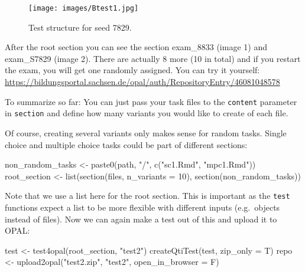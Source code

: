 \documentclass[twoside]{tufte-book}
\newenvironment{Shaded}{}{}
\newcommand{\AttributeTok}[1]{\textcolor[rgb]{0.49,0.56,0.16}{#1}}
\newcommand{\DecValTok}[1]{\textcolor[rgb]{0.25,0.63,0.44}{#1}}
\newcommand{\FunctionTok}[1]{\textcolor[rgb]{0.02,0.16,0.49}{#1}}
\newcommand{\NormalTok}[1]{#1}
\newcommand{\OtherTok}[1]{\textcolor[rgb]{0.00,0.44,0.13}{#1}}
\newcommand{\StringTok}[1]{\textcolor[rgb]{0.25,0.44,0.63}{#1}}
\begin{document}
\begin{figure}
\centering
\texttt{[image: images/Btest1.jpg]}
\caption{\label{b1}Test structure for seed 7829.}
\end{figure}

After the root section you can see the section exam\_8833 (image 1) and exam\_S7829 (image 2). There are actually 8 more (10 in total) and if you restart the exam, you will get one randomly assigned. You can try it yourself: \url{https://bildungsportal.sachsen.de/opal/auth/RepositoryEntry/46081048578}

To summarize so far: You can just pass your task files to the \texttt{content} parameter in \texttt{section} and define how many variants you would like to create of each file.

Of course, creating several variants only makes sense for random tasks. Single choice and multiple choice tasks could be part of different sections:

\begin{Shaded}
\begin{Highlighting}[]
\NormalTok{non\_random\_tasks }\OtherTok{\textless{}{-}} \FunctionTok{paste0}\NormalTok{(path, }\StringTok{"/"}\NormalTok{, }\FunctionTok{c}\NormalTok{(}\StringTok{"sc1.Rmd"}\NormalTok{, }\StringTok{"mpc1.Rmd"}\NormalTok{))}
\NormalTok{root\_section }\OtherTok{\textless{}{-}} \FunctionTok{list}\NormalTok{(}\FunctionTok{section}\NormalTok{(files, }\AttributeTok{n\_variants =} \DecValTok{10}\NormalTok{),}
                     \FunctionTok{section}\NormalTok{(non\_random\_tasks))}
\end{Highlighting}
\end{Shaded}

Note that we use a list here for the root section. This is important as the \texttt{test} functions expect a list to be more flexible with different inputs (e.g.~objects instead of files). Now we can again make a test out of this and upload it to OPAL:

\begin{Shaded}
\begin{Highlighting}[]
\NormalTok{test }\OtherTok{\textless{}{-}} \FunctionTok{test4opal}\NormalTok{(root\_section, }\StringTok{"test2"}\NormalTok{)}
\FunctionTok{createQtiTest}\NormalTok{(test, }\AttributeTok{zip\_only =}\NormalTok{ T)}
\NormalTok{repo }\OtherTok{\textless{}{-}} \FunctionTok{upload2opal}\NormalTok{(}\StringTok{"test2.zip"}\NormalTok{, }\StringTok{"test2"}\NormalTok{, }\AttributeTok{open\_in\_browser =}\NormalTok{ F)}
\end{Highlighting}
\end{Shaded}
\end{document}
